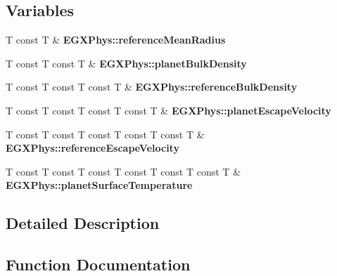 \subsection*{Variables}
\begin{DoxyCompactItemize}
\item 
\mbox{\label{group___astrophysics_ga6df51df8966c07fd3d79ce6f1e6d31e9}} 
T const T \& {\bfseries E\+G\+X\+Phys\+::reference\+Mean\+Radius}
\item 
\mbox{\label{group___astrophysics_gacebbbb12edf2abb6cbda8962d3ab3765}} 
T const T const T \& {\bfseries E\+G\+X\+Phys\+::planet\+Bulk\+Density}
\item 
\mbox{\label{group___astrophysics_gae3aaabec61cc5d343aa9e0be53ea0a84}} 
T const T const T const T \& {\bfseries E\+G\+X\+Phys\+::reference\+Bulk\+Density}
\item 
\mbox{\label{group___astrophysics_ga703b714efa9538d4a6245aba4e086ffb}} 
T const T const T const T const T \& {\bfseries E\+G\+X\+Phys\+::planet\+Escape\+Velocity}
\item 
\mbox{\label{group___astrophysics_ga2f813fba1c5f5b54b832628412946e8f}} 
T const T const T const T const T const T \& {\bfseries E\+G\+X\+Phys\+::reference\+Escape\+Velocity}
\item 
\mbox{\label{group___astrophysics_gaf80e0110f6ea7b712de28dc76eac5b54}} 
T const T const T const T const T const T const T \& {\bfseries E\+G\+X\+Phys\+::planet\+Surface\+Temperature}
\end{DoxyCompactItemize}


\subsection{Detailed Description}


\subsection{Function Documentation}
\mbox{\label{group___astrophysics_ga2fc1c406ce10f59b4f325150aecd279a}} 
